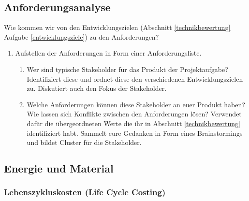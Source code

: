\documentclass[headinclude=true]{scrartcl}
\begin{document}
\subsection{Anforderungsanalyse}

Wie kommen wir von den Entwicklungszielen (Abschnitt \ref{technikbewertung} Aufgabe
\ref{entwicklungsziele}) zu den Anforderungen?

\begin{enumerate}
	\item
	      Aufstellen der Anforderungen in Form einer Anforderungsliste. 

	      \begin{enumerate}
		      \item
		            Wer sind typische Stakeholder für das Produkt der Projektaufgabe?
		            Identifiziert diese und ordnet diese den verschiedenen
		            Entwicklungszielen zu. Diskutiert auch den Fokus der Stakeholder.
		      \item
		            Welche Anforderungen können diese Stakeholder an euer Produkt  haben? Wie lassen sich Konflikte zwischen den
		            Anforderungen lösen? Verwendet dafür die übergeordneten Werte die ihr in Abschnitt \ref{technikbewertung} identifiziert habt. Sammelt eure Gedanken in Form eines Brainstormings
		            und bildet Cluster für die Stakeholder.
	      \end{enumerate}
\end{enumerate}

\subsection{Energie und Material}
\label{energie_material}

\subsubsection{Lebenszykluskosten (Life Cycle Costing)}

\end{document}
